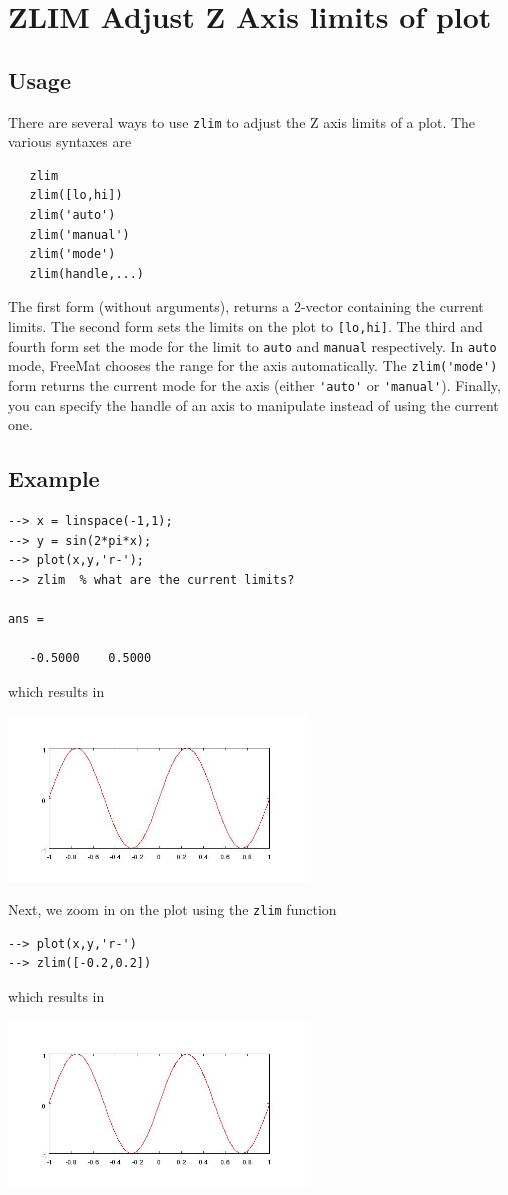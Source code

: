 \section{ZLIM Adjust Z Axis limits of plot}

\subsection{Usage}

There are several ways to use \verb|zlim| to adjust the Z axis limits of
a plot.  The various syntaxes are
\begin{verbatim}
   zlim
   zlim([lo,hi])   
   zlim('auto')
   zlim('manual')
   zlim('mode')
   zlim(handle,...)
\end{verbatim}
The first form (without arguments), returns a 2-vector containing the
current limits.  The second form sets the limits on the plot to \verb|[lo,hi]|.
The third and fourth form set the mode for the limit to \verb|auto| and \verb|manual|
respectively.  In \verb|auto| mode, FreeMat chooses the range for the axis 
automatically.  The \verb|zlim('mode')| form returns the current mode for the axis
(either \verb|'auto'| or \verb|'manual'|).  Finally, you can specify the handle of an
axis to manipulate instead of using the current one.
\subsection{Example}

\begin{verbatim}
--> x = linspace(-1,1);
--> y = sin(2*pi*x);
--> plot(x,y,'r-');
--> zlim  % what are the current limits?

ans = 

   -0.5000    0.5000 
\end{verbatim}
which results in


\centerline{\includegraphics[width=8cm]{zlim1}}

Next, we zoom in on the plot using the \verb|zlim| function
\begin{verbatim}
--> plot(x,y,'r-')
--> zlim([-0.2,0.2])
\end{verbatim}
which results in


\centerline{\includegraphics[width=8cm]{zlim2}}

